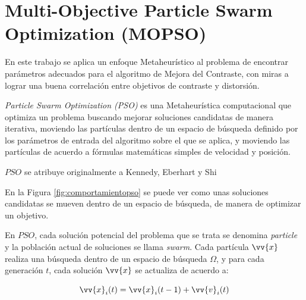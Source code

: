 \section{Multi-Objective Particle Swarm Optimization (MOPSO)}

En este trabajo se aplica un enfoque Metaheurístico al problema de encontrar parámetros adecuados para el algoritmo de Mejora del Contraste, con miras a lograr una buena correlación entre objetivos de contraste y distorsión.


\textit{Particle Swarm Optimization (PSO)} es una Metaheurística computacional que optimiza un problema buscando mejorar soluciones candidatas de manera iterativa, moviendo las partículas dentro de un espacio de búsqueda definido por los parámetros de entrada del algoritmo sobre el que se aplica, y moviendo las partículas de acuerdo a fórmulas matemáticas simples de velocidad y posición. 

$PSO$ se atribuye originalmente a Kennedy, Eberhart y Shi \cite{488968,699146}

En la Figura \ref{fig:comportamientopso} se puede ver como unas soluciones candidatas se mueven dentro de un espacio de búsqueda, de manera de optimizar un objetivo.

En $PSO$, cada solución potencial del problema que se trata se denomina \textit{particle} y la población actual de soluciones se llama \textit{swarm}. Cada partícula $\vv{x}$\label{symbol:mopsoparticula} realiza una búsqueda dentro de un espacio de búsqueda $\Omega$, y para cada generación $t$, cada solución $\vv{x}$ se actualiza de acuerdo a: 


\begin{equation}\label{eq:posicion1}
\vv{x}_i(t) = \vv{x}_i(t-1) + \vv{v}_i(t)
\end{equation}




